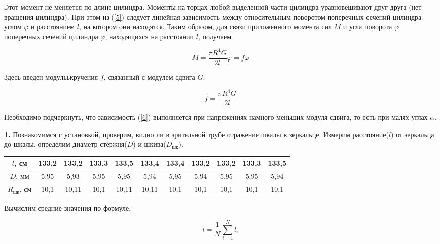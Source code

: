 \documentclass[12pt,a4paper]{article}
\begin{document}
Этот момент не меняется по длине цилиндра. Моменты на торцах любой выделенной части цилиндра уравновешивают друг друга (нет вращения цилиндра). При этом из (\ref{5}) следует линейная зависимость между относительным поворотом поперечных сечений цилиндра - углом $\varphi$ и расстоянием $l$, на котором они находятся. Таким образом, для связи приложенного момента сил $M$ и угла поворота $\varphi$ поперечных сечений цилиндра $\varphi$, находящихся на расстоянии $l$, получаем

\begin{equation}\label{6}
    M = \frac{\pi R^4 G}{2l}\varphi = f\varphi
\end{equation}

Здесь введен модульькручения $f$, связанный с модулем сдвига $G$:

\begin{equation}\label{7}
    f = \frac{\pi R^4 G}{2l}
\end{equation}

Необходимо подчеркнуть, что зависимость (\ref{6}) выполняется при напряжениях намного меньших модуля сдвига, то есть при малях углах $\alpha$.

\vspace{0,5cm}

\textbf{1.} Познакомимся с установкой, проверим, видно ли в зрительной трубе отражение шкалы в зеркальце. Измерим расстояние($l$) от зеркальца до шкалы, определим диаметр стержня($D$) и шкива($D_{\text{шк}}$).

\vspace{0,5cm}

\begin{tabular}{|c|c|c|c|c|c|c|c|c|c|c|}
\hline
$l$, см & 133,2 & 133,2 & 133,3 & 133,5 & 133,4 & 133,4 & 133,2 & 133,2 & 133,3 & 133,5 \\
\hline
$D$, мм & 5,95 & 5,93 & 5,95 & 5,95 & 5,94 & 5,95 & 5,94 & 5,95 & 5,95 & 5,94 \\
\hline
$R_{\text{шк}}$, см & 10,1 & 10,11 & 10,1 & 10,11 & 10,11 & 10,1 & 10,1 & 10,1 & 10,1 & 10,1 \\
\hline
\end{tabular}

\vspace{0,5cm}

Вычислим средние значения по формуле:

\begin{equation}\label{13}
l = \frac{1}{N} \sum\limits_{\textit{i} = 1}^N l_{\textit{i}}
\end{equation}
\end{document}
